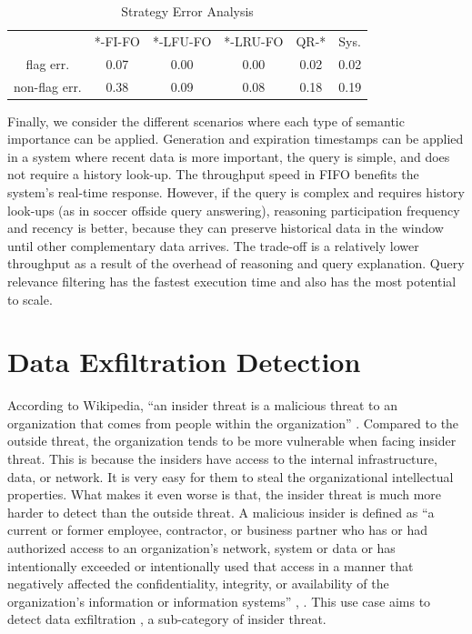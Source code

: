 \begin{table}[!htbp]
\centering
\caption{Strategy Error Analysis}
\label{tab:error}
\begin{tabular}{|c||c|c|c|c|l|}
\hline
 & *-FI-FO & *-LFU-FO & *-LRU-FO & QR-* & Sys. \\ \hhline{|=#=|=|=|=|=|}
flag err. & 0.07 & 0.00 & 0.00 & 0.02 & 0.02 \\ \hline
non-flag err. & 0.38 & 0.09 & 0.08 & 0.18 & 0.19 \\ \hline
\end{tabular}
\end{table}

Finally, we consider the different scenarios where each type of semantic importance can be applied. 
Generation and expiration timestamps can be applied in a system where recent data is more important, the query is simple, and does not require a history look-up. 
The throughput speed in FIFO benefits the system's real-time response. 
However, if the query is complex and requires history look-ups (as in soccer offside query answering), reasoning participation frequency and recency is better, because they can preserve historical data in the window until other complementary data arrives. 
The trade-off is a relatively lower throughput as a result of the overhead of reasoning and query explanation.
Query relevance filtering has the fastest execution time and also has the most potential to scale.
%
\section{Data Exfiltration Detection}
According to Wikipedia, ``an insider threat is a malicious threat to an organization that comes from people within the organization'' \cite{insiderthreat}. 
Compared to the outside threat, the organization tends to be more vulnerable when facing insider threat. 
This is because the insiders have access to the internal infrastructure, data, or network.
It is very easy for them to steal the organizational intellectual properties.
What makes it even worse is that, the insider threat is much more harder to detect than the outside threat. 
A malicious insider is defined as ``a current or former employee, contractor, or business partner who has or had authorized access to an organization's network, system or data or has intentionally exceeded or intentionally used that access in a manner that negatively affected the confidentiality, integrity, or availability of the organization's information or information systems'' \cite{CERT-onto}, \cite{silowash2012common}.
This use case aims to detect data exfiltration \cite{insiderthreatgithub}, a sub-category of insider threat.
%
